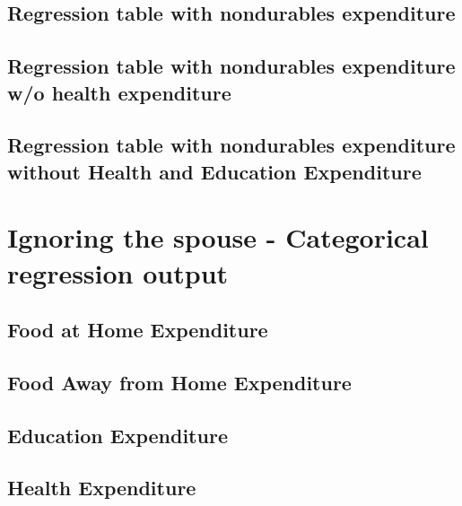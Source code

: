 \documentclass[a4paper,landscape]{article}
\begin{document}
\subsection{Regression table with nondurables expenditure }

\clearpage

\subsection{Regression table with nondurables expenditure w/o health expenditure} 

\clearpage

\subsection{Regression table with nondurables expenditure without Health and Education Expenditure}

\clearpage


\section{Ignoring the spouse - Categorical regression output}

\subsection{Food at Home Expenditure}

\clearpage

\subsection{Food Away from Home Expenditure}

\clearpage

\subsection{Education Expenditure}

\clearpage

\subsection{Health Expenditure}

\clearpage
\end{document}
